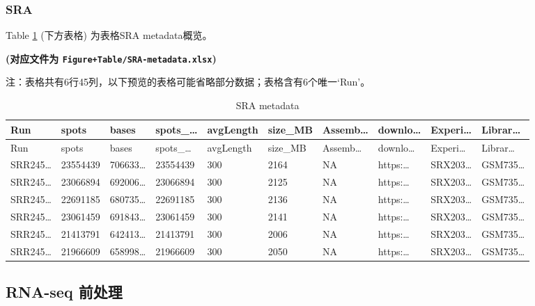 \documentclass[
]{article}
\begin{document}
\hypertarget{sra}{%
\subsubsection{SRA}\label{sra}}

Table \ref{tab:SRA-metadata} (下方表格) 为表格SRA metadata概览。

\textbf{(对应文件为 \texttt{Figure+Table/SRA-metadata.xlsx})}

\begin{center}\begin{tcolorbox}[colback=gray!10, colframe=gray!50, width=0.9\linewidth, arc=1mm, boxrule=0.5pt]注：表格共有6行45列，以下预览的表格可能省略部分数据；表格含有6个唯一`Run'。
\end{tcolorbox}
\end{center}

\begin{longtable}[]{@{}llllllllll@{}}
\caption{\label{tab:SRA-metadata}SRA metadata}\tabularnewline
\toprule
Run & spots & bases & spots\_\ldots{} & avgLength & size\_MB & Assemb\ldots{} & downlo\ldots{} & Experi\ldots{} & Librar\ldots{}\tabularnewline
\midrule
\endfirsthead
\toprule
Run & spots & bases & spots\_\ldots{} & avgLength & size\_MB & Assemb\ldots{} & downlo\ldots{} & Experi\ldots{} & Librar\ldots{}\tabularnewline
\midrule
\endhead
SRR245\ldots{} & 23554439 & 706633\ldots{} & 23554439 & 300 & 2164 & NA & https:\ldots{} & SRX203\ldots{} & GSM735\ldots{}\tabularnewline
SRR245\ldots{} & 23066894 & 692006\ldots{} & 23066894 & 300 & 2125 & NA & https:\ldots{} & SRX203\ldots{} & GSM735\ldots{}\tabularnewline
SRR245\ldots{} & 22691185 & 680735\ldots{} & 22691185 & 300 & 2136 & NA & https:\ldots{} & SRX203\ldots{} & GSM735\ldots{}\tabularnewline
SRR245\ldots{} & 23061459 & 691843\ldots{} & 23061459 & 300 & 2141 & NA & https:\ldots{} & SRX203\ldots{} & GSM735\ldots{}\tabularnewline
SRR245\ldots{} & 21413791 & 642413\ldots{} & 21413791 & 300 & 2006 & NA & https:\ldots{} & SRX203\ldots{} & GSM735\ldots{}\tabularnewline
SRR245\ldots{} & 21966609 & 658998\ldots{} & 21966609 & 300 & 2050 & NA & https:\ldots{} & SRX203\ldots{} & GSM735\ldots{}\tabularnewline
\bottomrule
\end{longtable}

\hypertarget{rna-seq-ux524dux5904ux7406}{%
\subsection{RNA-seq 前处理}\label{rna-seq-ux524dux5904ux7406}}
\end{document}
